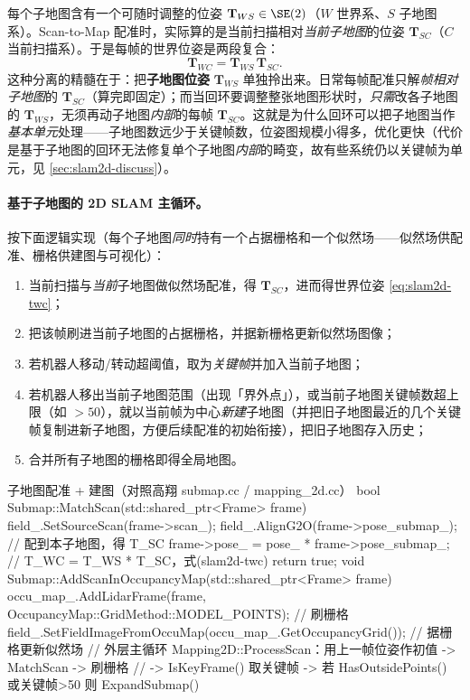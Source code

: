 每个子地图含有一个可随时调整的位姿 $\mathbf{T}_{WS}\in\SE(2)$（$W$ 世界系、$S$ 子地图系）。Scan-to-Map 配准时，实际算的是当前扫描相对\emph{当前子地图}的位姿 $\mathbf{T}_{SC}$（$C$ 当前扫描系）。于是每帧的世界位姿是两段复合：
\begin{equation}
\mathbf{T}_{WC}=\mathbf{T}_{WS}\,\mathbf{T}_{SC}.
\label{eq:slam2d-twc}
\end{equation}
这种分离的精髓在于：把\textbf{子地图位姿} $\mathbf{T}_{WS}$ 单独拎出来。日常每帧配准只解\emph{帧相对子地图}的 $\mathbf{T}_{SC}$（算完即固定）；而当回环要调整整张地图形状时，\emph{只需}改各子地图的 $\mathbf{T}_{WS}$，无须再动子地图\emph{内部}的每帧 $\mathbf{T}_{SC}$。这就是为什么回环可以把子地图当作\emph{基本单元}处理——子地图数远少于关键帧数，位姿图规模小得多，优化更快（代价是基于子地图的回环无法修复单个子地图\emph{内部}的畸变，故有些系统仍以关键帧为单元，见 \cref{sec:slam2d-discuss}）。

\paragraph{基于子地图的 2D SLAM 主循环。}
按下面逻辑实现（每个子地图\emph{同时}持有一个占据栅格和一个似然场——似然场供配准、栅格供建图与可视化）：
\begin{enumerate}
  \item 当前扫描与\emph{当前}子地图做似然场配准，得 $\mathbf{T}_{SC}$，进而得世界位姿 \cref{eq:slam2d-twc}；
  \item 把该帧刷进当前子地图的占据栅格，并据新栅格更新似然场图像；
  \item 若机器人移动/转动超阈值，取为\emph{关键帧}并加入当前子地图；
  \item 若机器人移出当前子地图范围（出现「界外点」），或当前子地图关键帧数超上限（如 $>50$），就以当前帧为中心\emph{新建}子地图（并把旧子地图最近的几个关键帧复制进新子地图，方便后续配准的初始衔接），把旧子地图存入历史；
  \item 合并所有子地图的栅格即得全局地图。
\end{enumerate}

\begin{codebox}[C++]{子地图配准 + 建图（对照高翔 submap.cc / mapping\_2d.cc）}
bool Submap::MatchScan(std::shared_ptr<Frame> frame) {
  field_.SetSourceScan(frame->scan_);
  field_.AlignG2O(frame->pose_submap_);                 // 配到本子地图，得 T_SC
  frame->pose_ = pose_ * frame->pose_submap_;            // T_WC = T_WS * T_SC，式(slam2d-twc)
  return true;
}
void Submap::AddScanInOccupancyMap(std::shared_ptr<Frame> frame) {
  occu_map_.AddLidarFrame(frame, OccupancyMap::GridMethod::MODEL_POINTS); // 刷栅格
  field_.SetFieldImageFromOccuMap(occu_map_.GetOccupancyGrid());          // 据栅格更新似然场
}
// 外层主循环 Mapping2D::ProcessScan：用上一帧位姿作初值 -> MatchScan -> 刷栅格
//   -> IsKeyFrame() 取关键帧 -> 若 HasOutsidePoints() 或关键帧>50 则 ExpandSubmap()
\end{codebox}

